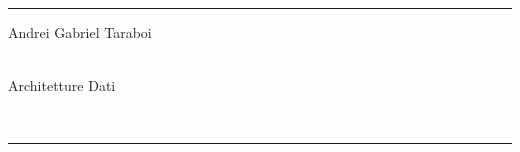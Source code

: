 \documentclass[a4paper]{article}
\begin{document}

\fancyhead[C]{}
\hrule \medskip %
\begin{minipage}{0.295\textwidth} 
\raggedright
\footnotesize
Andrei Gabriel Taraboi \hfill\\   
\hfill\\
\end{minipage}
\begin{minipage}{0.4\textwidth} 
\centering 
\large 
Architetture Dati\\ 
\normalsize 
\end{minipage}
\begin{minipage}{0.295\textwidth} 
\raggedleft
\hfill\\
\end{minipage}
\medskip\hrule 

% 
% 
% 
% 
% 
% 
% 
% 
% 
% 
% 
% 
% 
% 
% 



\end{document}

